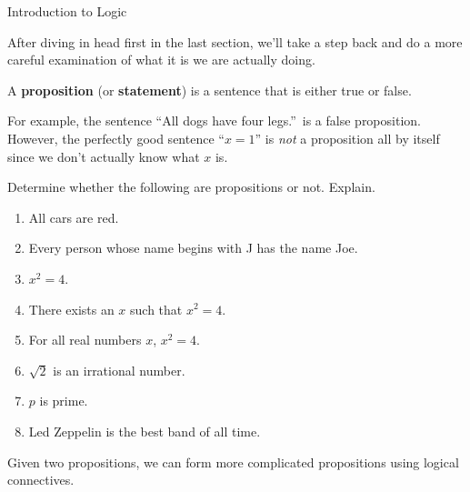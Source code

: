 \begin{section}{Introduction to Logic}

After diving in head first in the last section, we'll take a step back and do a more careful examination of what it is we are actually doing.

\begin{definition}
A \textbf{proposition} (or \textbf{statement}) is a sentence that is either true or false.
\end{definition}

For example, the sentence ``All dogs have four legs.''~is a false proposition.  However, the perfectly good sentence ``$x=1$'' is \emph{not} a proposition all by itself since we don't actually know what $x$ is.

\begin{problem} Determine whether the following are propositions or not. Explain.
\begin{enumerate}[label=\textrm{(\alph*)}]
\item All cars are red.
\item Every person whose name begins with J has the name Joe.
\item $x^2=4$.
\item There exists an $x$ such that $x^2=4$.
\item For all real numbers $x$, $x^2=4$.
\item $\sqrt{2}$ is an irrational number.
\item $p$ is prime.
\item Led Zeppelin is the best band of all time.
\end{enumerate}
\end{problem}

Given two propositions, we can form more complicated propositions using logical connectives.


\end{section}

